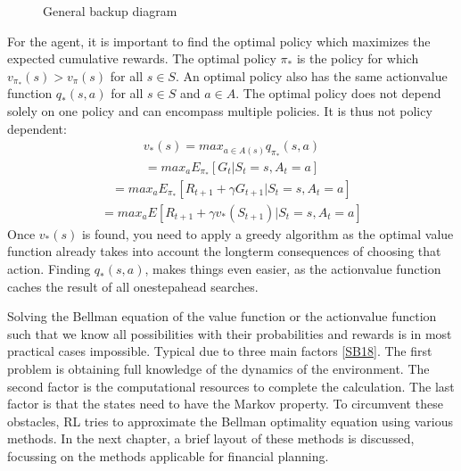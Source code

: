 \documentclass[letterpaper,10pt,english]{jupyterBook}
\let\sphinxpxdimen\pdfpxdimen\else\newdimen\sphinxpxdimen
\begin{document}
\begin{figure}[htbp]
\centering
\capstart

\noindent\sphinxincludegraphics[width=300\sphinxpxdimen,height=250\sphinxpxdimen]{{backup_diagram}.png}
\caption{General backup diagram}\label{\detokenize{Reinforcement_learning:backup-diagram-fig}}\end{figure}

\sphinxAtStartPar
For the agent, it is important to find the optimal policy which maximizes the expected cumulative rewards. The optimal policy \(\pi_*\) is the policy for which \(v_{\pi_*}(s) > v_{\pi}(s)\) for all \(s \in S\). An optimal policy also has the same action\sphinxhyphen{}value function \(q_*(s,a)\) for all \(s \in S\) and \(a \in A\). The optimal policy does not depend solely on one policy and can encompass multiple policies. It is thus not policy dependent:
\begin{equation*}
\begin{split} v_*(s) = max_{a \in A(s)} q_{\pi_*}(s,a) \end{split}
\end{equation*}\begin{equation*}
\begin{split} = max_{a} E_{\pi_*}[G_t | S_t=s, A_t=a] \end{split}
\end{equation*}\begin{equation*}
\begin{split} = max_{a} E_{\pi_*}[R_{t+1} + \gamma G_{t+1} | S_t=s, A_t=a] \end{split}
\end{equation*}\begin{equation*}
\begin{split} = max_{a} E[R_{t+1} + \gamma v_*(S_{t+1}) | S_t=s, A_t=a] \end{split}
\end{equation*}
\sphinxAtStartPar
Once \(v_*(s)\) is found, you  need to apply a greedy algorithm as the optimal value function already takes into account the long\sphinxhyphen{}term consequences of choosing that action. Finding \(q_*(s,a)\), makes things even easier, as the action\sphinxhyphen{}value function caches the result of all one\sphinxhyphen{}step\sphinxhyphen{}ahead searches.

\sphinxAtStartPar
Solving the Bellman equation of the value function or the action\sphinxhyphen{}value function such that we know all possibilities with their probabilities and rewards is in most practical cases impossible. Typical due to three main factors {[}\hyperlink{cite.Discussion:id57}{SB18}{]}. The first problem is obtaining full knowledge of the dynamics of the environment. The second factor is the computational resources to complete the calculation. The last factor is that the states need to have the Markov property. To circumvent these obstacles, RL tries to approximate the Bellman optimality equation using various methods. In the next chapter, a brief layout of these methods is discussed, focussing on the methods applicable for financial planning.
\end{document}
